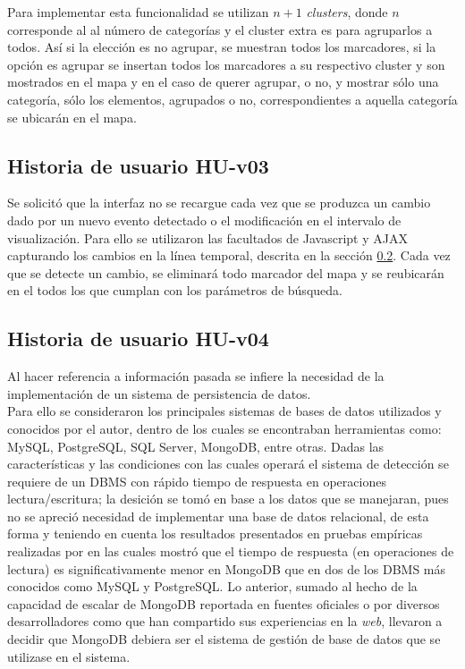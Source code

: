 Para implementar esta funcionalidad se utilizan $n + 1$ \textit{clusters}, donde $n$ corresponde al al número de categorías y el cluster extra es para agruparlos a todos. Así si la elección es no agrupar, se muestran todos los marcadores, si la opción es agrupar se insertan todos los marcadores a su respectivo cluster y son mostrados en el mapa y en el caso de querer agrupar, o no, y mostrar sólo una categoría, sólo los elementos, agrupados o no, correspondientes a aquella categoría se ubicarán en el mapa.
 
\subsection{Historia de usuario HU-v03}
\label{subsec:HU-v03}

Se solicitó que la interfaz no se recargue cada vez que se produzca un cambio dado por un nuevo evento detectado o el modificación en el intervalo de visualización. Para ello se utilizaron las facultados de Javascript y AJAX capturando los cambios en la línea temporal, descrita en la sección \ref{subsec:HU-v04}. Cada vez que se detecte un cambio, se eliminará todo marcador del mapa y se reubicarán en el todos los que cumplan con los parámetros de búsqueda.

\subsection{Historia de usuario HU-v04}
\label{subsec:HU-v04}

Al hacer referencia a información pasada se infiere la necesidad de la implementación de un sistema de persistencia de datos.\\

Para ello se consideraron los principales sistemas de bases de datos utilizados y conocidos por el autor, dentro de los cuales se encontraban herramientas como: MySQL, PostgreSQL, SQL Server, MongoDB, entre otras. Dadas las características y las condiciones con las cuales operará el sistema de detección se requiere de un DBMS con rápido tiempo de respuesta en operaciones lectura/escritura; la desición se tomó en base a los datos que se manejaran, pues no se apreció necesidad de implementar una base de datos relacional, de esta forma y teniendo en cuenta los resultados presentados en pruebas empíricas realizadas por \cite{MongoPerformance} en las cuales mostró que el tiempo de respuesta (en operaciones de lectura) es significativamente menor en MongoDB que en dos de los DBMS más conocidos como MySQL y PostgreSQL. Lo anterior, sumado al hecho de la capacidad de escalar de MongoDB reportada en fuentes oficiales o por diversos desarrolladores como \cite{MongoDBScalability} que han compartido sus experiencias en la \textit{web}, llevaron a decidir que MongoDB debiera ser el sistema de gestión de base de datos que se utilizase en el sistema.\\

